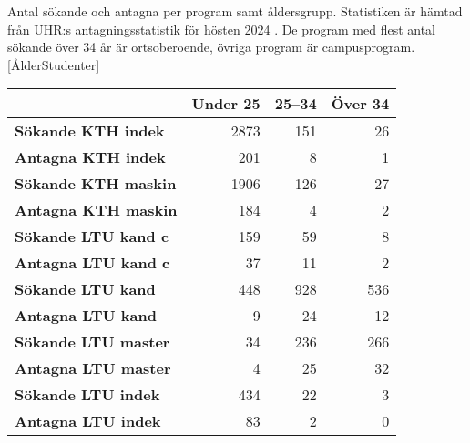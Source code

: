 \documentclass[a4paper,oneside,article,swedish]{memoir}
\begin{document}
\begin{table}
  \begin{sidecaption}{%
    Antal sökande och antagna per program samt åldersgrupp.
    Statistiken är hämtad från UHR:s antagningsstatistik för hösten 2024 
    \parencite{UHRstat}.
    De program med flest antal sökande över 34 år är ortsoberoende, övriga 
    program är campusprogram.
  }[ÅlderStudenter]
  \flushright
  \begin{tabular}{lrrr}
    \toprule
    & \textbf{Under 25} & \textbf{25--34} & \textbf{Över 34} \\
    \midrule
    \textbf{Sökande KTH indek} & 2873 & 151 & 26 \\
    \textbf{Antagna KTH indek} & 201 & 8 & 1 \\
    \midrule
    \textbf{Sökande KTH maskin} & 1906 & 126 & 27 \\
    \textbf{Antagna KTH maskin} & 184 & 4 & 2 \\
    \midrule
    \textbf{Sökande LTU kand c} & 159 & 59 & 8 \\
    \textbf{Antagna LTU kand c} & 37 & 11 & 2 \\
    \midrule
    \textbf{Sökande LTU kand} & 448 & 928 & 536 \\
    \textbf{Antagna LTU kand} & 9 & 24 & 12 \\
    \midrule
    \textbf{Sökande LTU master} & 34 & 236 & 266 \\
    \textbf{Antagna LTU master} & 4 & 25 & 32 \\
    \midrule
    \textbf{Sökande LTU indek} & 434 & 22 & 3 \\
    \textbf{Antagna LTU indek} & 83 & 2 & 0 \\
    \bottomrule
  \end{tabular}
  \end{sidecaption}
\end{table}
\end{document}
